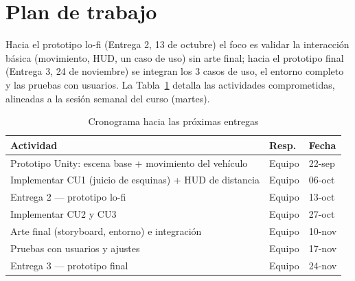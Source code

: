 \documentclass[conference]{IEEEtran}
\begin{document}
\section{Plan de trabajo}
\label{sec:plan}

Hacia el prototipo lo-fi (Entrega 2, 13 de octubre) el foco es
validar la interacción básica (movimiento, HUD, un caso de uso) sin
arte final; hacia el prototipo final (Entrega 3, 24 de noviembre) se
integran los 3 casos de uso, el entorno completo y las pruebas con
usuarios. La Tabla~\ref{tab:cronograma} detalla las actividades
comprometidas, alineadas a la sesión semanal del curso (martes).

\begin{table}[htbp]
\caption{Cronograma hacia las próximas entregas}
\begin{center}
\begin{tabular}{|p{3.4cm}|p{1.6cm}|p{1.6cm}|}
\hline
\textbf{Actividad} & \textbf{Resp.} & \textbf{Fecha} \\
\hline
Prototipo Unity: escena base + movimiento del vehículo & Equipo & 22-sep \\
\hline
Implementar CU1 (juicio de esquinas) + HUD de distancia & Equipo & 06-oct \\
\hline
Entrega 2 --- prototipo lo-fi & Equipo & 13-oct \\
\hline
Implementar CU2 y CU3 & Equipo & 27-oct \\
\hline
Arte final (storyboard, entorno) e integración & Equipo & 10-nov \\
\hline
Pruebas con usuarios y ajustes & Equipo & 17-nov \\
\hline
Entrega 3 --- prototipo final & Equipo & 24-nov \\
\hline
\end{tabular}
\label{tab:cronograma}
\end{center}
\end{table}



\end{document}
